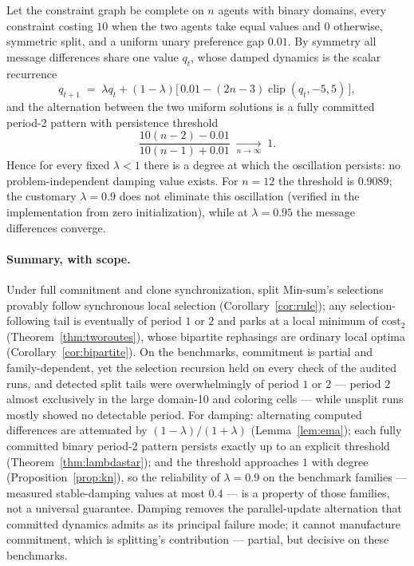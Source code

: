 \begin{proposition}\label{prop:kn}
Let the constraint graph be complete on $n$ agents with binary domains,
every constraint costing $10$ when the two agents take equal values and
$0$ otherwise, symmetric split, and a uniform unary preference gap
$0.01$.  By symmetry all message differences share one value $q_t$,
whose damped dynamics is the scalar recurrence
\[
  q_{t+1} \;=\; \lambda q_t + (1-\lambda)\big[\,0.01 -
  (2n-3)\operatorname{clip}(q_t, -5, 5)\,\big],
\]
and the alternation between the two uniform solutions is a fully
committed period-2 pattern with persistence threshold
\[
  \frac{10(n-2) - 0.01}{10(n-1) + 0.01} \;\xrightarrow[n\to\infty]{}\; 1 .
\]
Hence for every fixed $\lambda < 1$ there is a degree at which the
oscillation persists: no problem-independent damping value exists.  For
$n = 12$ the threshold is $0.9089$; the customary $\lambda = 0.9$ does
not eliminate this oscillation (verified in the implementation from zero
initialization), while at $\lambda = 0.95$ the message differences
converge.
\end{proposition}

\paragraph{Summary, with scope.}
Under full commitment and clone synchronization, split Min-sum's
selections provably follow synchronous local selection
(Corollary~\ref{cor:rule}); any selection-following tail is eventually of
period $1$ or $2$ and parks at a local minimum of $\mathrm{cost}_2$
(Theorem~\ref{thm:tworoutes}), whose bipartite rephasings are ordinary
local optima (Corollary~\ref{cor:bipartite}).  On the benchmarks,
commitment is partial and family-dependent, yet the selection recursion
held on every check of the audited runs, and detected split tails were
overwhelmingly of period $1$ or $2$ --- period $2$ almost exclusively in
the large domain-10 and coloring cells --- while unsplit runs mostly
showed no detectable period.  For damping: alternating computed
differences are attenuated by $(1-\lambda)/(1+\lambda)$
(Lemma~\ref{lem:ema}); each fully committed binary period-2 pattern
persists exactly up to an explicit threshold
(Theorem~\ref{thm:lambdastar}); and the threshold approaches $1$ with
degree (Proposition~\ref{prop:kn}), so the reliability of
$\lambda = 0.9$ on the benchmark families --- measured stable-damping
values at most $0.4$ --- is a property of those families, not a universal
guarantee.  Damping removes the parallel-update alternation that
committed dynamics admits as its principal failure mode; it cannot
manufacture commitment, which is splitting's contribution --- partial,
but decisive on these benchmarks.
